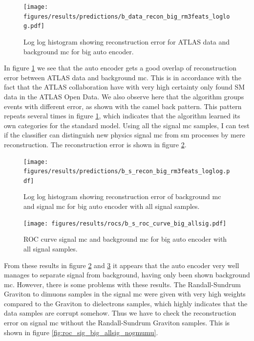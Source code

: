 \documentclass[ reprint, amsmath,amssymb, aps, nofootinbib]{revtex4-2}
\begin{document}
\begin{figure}[H]
     \centering
         \texttt{[image: figures/results/predictions/b\_data\_recon\_big\_rm3feats\_loglog.pdf]}
         \caption{Log log histogram showing reconstruction error for ATLAS data and background mc for big auto encoder. }
     \label{fig:data_b_big_pred}
\end{figure}

In figure \ref{fig:data_b_big_pred} we see that the auto encoder gets a good overlap of reconstruction error between ATLAS data and background mc. This is in accordance with the fact that the ATLAS collaboration have with very high certainty only found SM data in the ATLAS Open Data. We also observe here that the algorithm groups events with different error, as shown with the camel back pattern. This pattern repeats several times in figure \ref{fig:data_b_big_pred}, which indicates that the algorithm learned its own categories for the standard model. Using all the signal mc samples, I can test if the classifier can distinguish new physics signal mc from sm processes by mere reconstruction. The reconstruction error is shown in figure \ref{fig:s_b_big_pred_allsig}.


\begin{figure}[H]
     \centering
         \texttt{[image: figures/results/predictions/b\_s\_recon\_big\_rm3feats\_loglog.pdf]}
    \caption{Log log histogram showing reconstruction error of background mc and signal mc for big auto encoder with all signal samples.  }
    \label{fig:s_b_big_pred_allsig}
\end{figure}


\begin{figure}[H]    
    
    \centering
         \texttt{[image: figures/results/rocs/b\_s\_roc\_curve\_big\_allsig.pdf]}
         \caption{ROC curve signal mc and background mc for big auto encoder with all signal samples.}
         \label{fig:s_b_big_roc_allsig}
\end{figure}


From these results in figure \ref{fig:s_b_big_pred_allsig} and \ref{fig:s_b_big_roc_allsig} it appears that the auto encoder very well manages to separate signal from background, having only been shown background mc. However, there is some problems with these results. The Randall-Sundrum Graviton to dimuons samples in the signal mc were given with very high weights compared to the Graviton to dielectrons samples, which highly indicates that the data samples are corrupt somehow. Thus we have to check the reconstruction error on signal mc without the Randall-Sundrum Graviton samples. This is shown in figure \ref{fig:roc_sig_big_allsig_nogmumu}.
\end{document}
